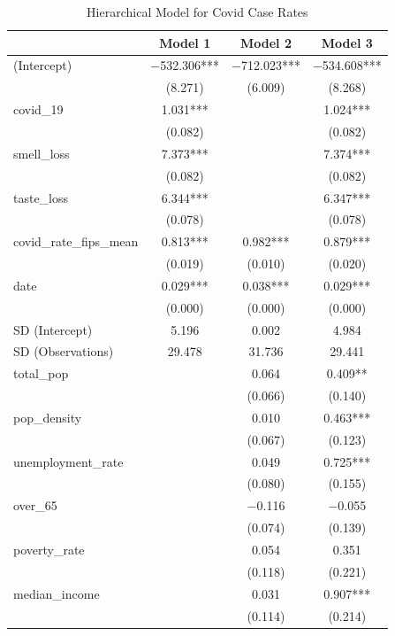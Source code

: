 \documentclass[
]{article}
\begin{document}
\begin{table}

\caption{\label{tab:covid_analysis}Hierarchical Model for Covid Case Rates}
\centering
\begin{tabular}[t]{lccc}
\toprule
  & Model 1 & Model 2 & Model 3\\
\midrule
(Intercept) & \num{-532.306}*** & \num{-712.023}*** & \num{-534.608}***\\
 & (\num{8.271}) & (\num{6.009}) & (\num{8.268})\\
covid\_19 & \num{1.031}*** &  & \num{1.024}***\\
 & (\num{0.082}) &  & \vphantom{1} (\num{0.082})\\
smell\_loss & \num{7.373}*** &  & \num{7.374}***\\
 & (\num{0.082}) &  & (\num{0.082})\\
taste\_loss & \num{6.344}*** &  & \num{6.347}***\\
 & (\num{0.078}) &  & (\num{0.078})\\
covid\_rate\_fips\_mean & \num{0.813}*** & \num{0.982}*** & \num{0.879}***\\
 & (\num{0.019}) & (\num{0.010}) & (\num{0.020})\\
date & \num{0.029}*** & \num{0.038}*** & \num{0.029}***\\
 & (\num{0.000}) & (\num{0.000}) & (\num{0.000})\\
SD (Intercept) & \num{5.196} & \num{0.002} & \num{4.984}\\
SD (Observations) & \num{29.478} & \num{31.736} & \num{29.441}\\
total\_pop &  & \num{0.064} & \num{0.409}**\\
 &  & (\num{0.066}) & (\num{0.140})\\
pop\_density &  & \num{0.010} & \num{0.463}***\\
 &  & (\num{0.067}) & (\num{0.123})\\
unemployment\_rate &  & \num{0.049} & \num{0.725}***\\
 &  & (\num{0.080}) & (\num{0.155})\\
over\_65 &  & \num{-0.116} & \num{-0.055}\\
 &  & (\num{0.074}) & (\num{0.139})\\
poverty\_rate &  & \num{0.054} & \num{0.351}\\
 &  & (\num{0.118}) & (\num{0.221})\\
median\_income &  & \num{0.031} & \num{0.907}***\\
 &  & (\num{0.114}) & (\num{0.214})\\

\end{tabular}
\end{table}
\end{document}
